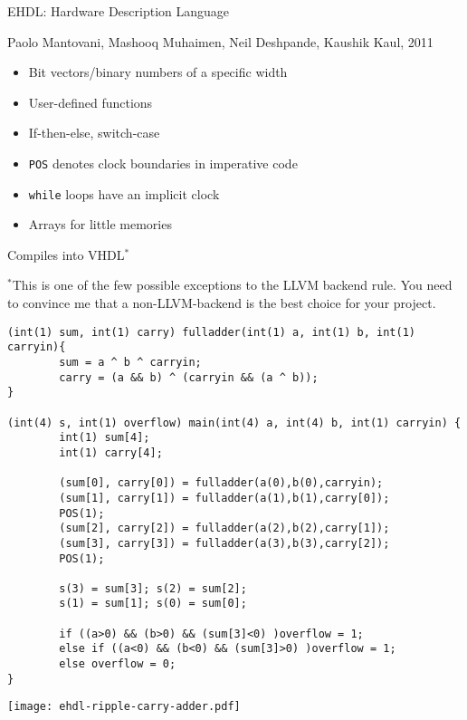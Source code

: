 \documentclass{plt}
\begin{document}
\begin{frame}{EHDL: Hardware Description Language}

{\small  
Paolo Mantovani,
Mashooq Muhaimen,
Neil Deshpande,
Kaushik Kaul,
2011
}

\begin{itemize}
\item Bit vectors/binary numbers of a specific width
\item User-defined functions
\item If-then-else, switch-case
\item \texttt{POS} denotes clock boundaries in imperative code
\item \texttt{while} loops have an implicit clock
\item Arrays for little memories
\end{itemize}

Compiles into VHDL$^*$

$^*$This is one of the few possible exceptions to the LLVM backend
rule.  You need to convince me that a non-LLVM-backend is the best
choice for your project.

\end{frame}

\begin{frame}[fragile]
\fontsize{8pt}{8pt}\selectfont
\begin{verbatim}
(int(1) sum, int(1) carry) fulladder(int(1) a, int(1) b, int(1) carryin){        
        sum = a ^ b ^ carryin;
        carry = (a && b) ^ (carryin && (a ^ b));       
}

(int(4) s, int(1) overflow) main(int(4) a, int(4) b, int(1) carryin) {         
        int(1) sum[4];
        int(1) carry[4];

        (sum[0], carry[0]) = fulladder(a(0),b(0),carryin);
        (sum[1], carry[1]) = fulladder(a(1),b(1),carry[0]);
        POS(1);
        (sum[2], carry[2]) = fulladder(a(2),b(2),carry[1]);
        (sum[3], carry[3]) = fulladder(a(3),b(3),carry[2]);
        POS(1);

        s(3) = sum[3]; s(2) = sum[2];
        s(1) = sum[1]; s(0) = sum[0];

        if ((a>0) && (b>0) && (sum[3]<0) )overflow = 1;
        else if ((a<0) && (b<0) && (sum[3]>0) )overflow = 1;
        else overflow = 0;
}
\end{verbatim}

\centerline{\texttt{[image: ehdl-ripple-carry-adder.pdf]}}
\end{frame}
\end{document}
